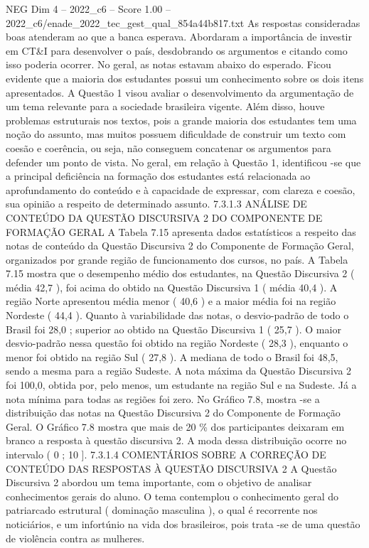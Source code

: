 \begin{textsample}{NEG Dim 4 – 2022\_c6 – Score 1.00 – 2022\_c6/enade\_2022\_tec\_gest\_qual\_854a44b817.txt}
As respostas consideradas boas atenderam ao que a banca esperava.
Abordaram a importância de investir em CT\&I para desenvolver o país, desdobrando os argumentos e citando como isso poderia ocorrer.
No geral, as notas estavam abaixo do esperado.
Ficou evidente que a maioria dos estudantes possui um conhecimento sobre os dois itens apresentados.
A Questão 1 visou avaliar o desenvolvimento da argumentação de um tema relevante para a sociedade brasileira vigente.
Além disso, houve problemas estruturais nos textos, pois a grande maioria dos estudantes tem uma noção do assunto, mas muitos possuem dificuldade de construir um texto com coesão e coerência, ou seja, não conseguem concatenar os argumentos para defender um ponto de vista.
No geral, em relação à Questão 1, identificou -se que a principal deficiência na formação dos estudantes está relacionada ao aprofundamento do conteúdo e à capacidade de expressar, com clareza e coesão, sua opinião a respeito de determinado assunto. 7.3.1.3 ANÁLISE DE CONTEÚDO DA QUESTÃO DISCURSIVA 2 DO COMPONENTE DE FORMAÇÃO GERAL A Tabela 7.15 apresenta dados estatísticos a respeito das notas de conteúdo da Questão Discursiva 2 do Componente de Formação Geral, organizados por grande região de funcionamento dos cursos, no país.
A Tabela 7.15 mostra que o desempenho médio dos estudantes, na Questão Discursiva 2 ( média 42,7 ), foi acima do obtido na Questão Discursiva 1 ( média 40,4 ).
A região Norte apresentou média menor ( 40,6 ) e a maior média foi na região Nordeste ( 44,4 ).
Quanto à variabilidade das notas, o desvio-padrão de todo o Brasil foi 28,0 ; superior ao obtido na Questão Discursiva 1 ( 25,7 ).
O maior desvio-padrão nessa questão foi obtido na região Nordeste ( 28,3 ), enquanto o menor foi obtido na região Sul ( 27,8 ).
A mediana de todo o Brasil foi 48,5, sendo a mesma para a região Sudeste.
A nota máxima da Questão Discursiva 2 foi 100,0, obtida por, pelo menos, um estudante na região Sul e na Sudeste.
Já a nota mínima para todas as regiões foi zero.
No Gráfico 7.8, mostra -se a distribuição das notas na Questão Discursiva 2 do Componente de Formação Geral.
O Gráfico 7.8 mostra que mais de 20 \% dos participantes deixaram em branco a resposta à questão discursiva 2.
A moda dessa distribuição ocorre no intervalo ( 0 ; 10 ]. 7.3.1.4 COMENTÁRIOS SOBRE A CORREÇÃO DE CONTEÚDO DAS RESPOSTAS À QUESTÃO DISCURSIVA 2 A Questão Discursiva 2 abordou um tema importante, com o objetivo de analisar conhecimentos gerais do aluno.
O tema contemplou o conhecimento geral do patriarcado estrutural ( dominação masculina ), o qual é recorrente nos noticiários, e um infortúnio na vida dos brasileiros, pois trata -se de uma questão de violência contra as mulheres.

\end{textsample}
